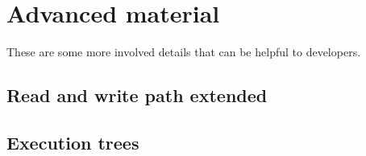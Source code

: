 \documentclass[11pt]{article}
\begin{document}
\hypertarget{advanced-material}{%
\section{Advanced material}\label{advanced-material}}

These are some more involved details that can be helpful to developers.

\hypertarget{read-and-write-path-extended}{%
\subsection{Read and write path
extended}\label{read-and-write-path-extended}}



\hypertarget{execution-trees}{%
\subsection{Execution trees}\label{execution-trees}}



\end{document}
